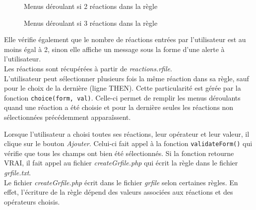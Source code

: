\begin{figure}[!ht]
	\begin{center}
		\caption{Menus déroulant si 2 réactions dans la règle}
  		\label{menusDeroulants1}
  	\end{center}	
\end{figure}

\begin{figure}[!ht]
	\begin{center}
		\caption{Menus déroulant si 3 réactions dans la règle}
  		\label{menusDeroulants2}
  	\end{center}	
\end{figure}

Elle vérifie également que le nombre de réactions entrées par l'utilisateur est au moins égal à 2, sinon elle affiche un message sous la forme d'une alerte à l'utilisateur.\\
Les réactions sont récupérées à partir de \emph{reactions.rfile}.\\

L'utilisateur peut sélectionner plusieurs fois la m\^eme réaction dans sa règle, sauf pour le choix de la dernière (ligne THEN). Cette particularité est gérée par la fonction \texttt{choice(form, val)}. Celle-ci permet de remplir les menus déroulants quand une réaction a été choisie et pour la dernière seules les réactions non sélectionnées précédemment appara\^issent.

Lorsque l'utilisateur a choisi toutes ses réactions, leur opérateur et leur valeur, il clique sur le bouton \emph{Ajouter}. Celui-ci fait appel à la fonction \texttt{validateForm()} qui vérifie que tous les champs ont bien été sélectionnés. Si la fonction retourne VRAI, il fait appel au fichier \emph{createGrfile.php} qui écrit la règle dans le fichier \emph{grfile.txt}.\\
Le fichier \emph{createGrfile.php} écrit dans le fichier \emph{grfile} selon certaines règles. En effet, l'écriture de la règle dépend des valeurs associées aux réactions et des opérateurs choisis.\\

